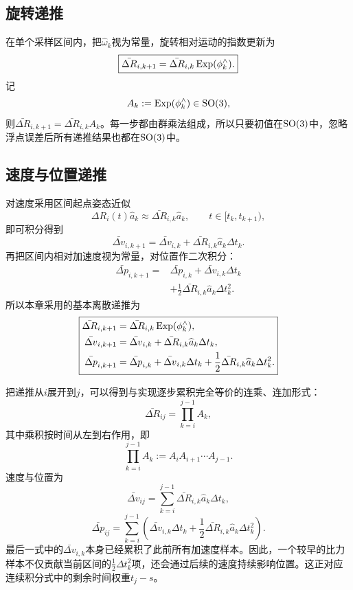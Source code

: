 \subsection{旋转递推}

在单个采样区间内，把$\widehat\omega_k$视为常量，旋转相对运动的指数更新为
\[
\boxed{
    \bar{\Delta R}_{i,k+1}
    =\bar{\Delta R}_{i,k}\operatorname{Exp}(\phi_k^\wedge).
}
\]
记
\[
    A_k:=\operatorname{Exp}(\phi_k^\wedge)\in\operatorname{SO}(3),
\]
则$\bar{\Delta R}_{i,k+1}=\bar{\Delta R}_{i,k}A_k$。每一步都由群乘法组成，所以只要初值在$\operatorname{SO}(3)$中，忽略浮点误差后所有递推结果也都在$\operatorname{SO}(3)$中。

\subsection{速度与位置递推}

对速度采用区间起点姿态近似
\[
    \Delta R_i(t)\widehat a_k
    \approx
    \bar{\Delta R}_{i,k}\widehat a_k,
    \qquad t\in[t_k,t_{k+1}),
\]
即可积分得到
\[
\boxed{
    \bar{\Delta v}_{i,k+1}
    =\bar{\Delta v}_{i,k}
    +\bar{\Delta R}_{i,k}\widehat a_k\Delta t_k.
}
\]
再把区间内相对加速度视为常量，对位置作二次积分：
\[
\boxed{
\begin{aligned}
    \bar{\Delta p}_{i,k+1}
    ={}&\bar{\Delta p}_{i,k}
    +\bar{\Delta v}_{i,k}\Delta t_k\\
    &+\frac12\bar{\Delta R}_{i,k}
      \widehat a_k\Delta t_k^2.
\end{aligned}
}
\]
所以本章采用的基本离散递推为
\[
\boxed{
\begin{aligned}
    \bar{\Delta R}_{i,k+1}
    &=\bar{\Delta R}_{i,k}\operatorname{Exp}(\phi_k^\wedge),\\
    \bar{\Delta v}_{i,k+1}
    &=\bar{\Delta v}_{i,k}
      +\bar{\Delta R}_{i,k}\widehat a_k\Delta t_k,\\
    \bar{\Delta p}_{i,k+1}
    &=\bar{\Delta p}_{i,k}
      +\bar{\Delta v}_{i,k}\Delta t_k
      +\frac12\bar{\Delta R}_{i,k}
       \widehat a_k\Delta t_k^2.
\end{aligned}
}
\]

把递推从$i$展开到$j$，可以得到与实现逐步累积完全等价的连乘、连加形式：
\[
\boxed{
    \bar{\Delta R}_{ij}
    =\prod_{k=i}^{j-1}A_k,
}
\]
其中乘积按时间从左到右作用，即
\[
    \prod_{k=i}^{j-1}A_k
    :=A_iA_{i+1}\cdots A_{j-1}.
\]
速度与位置为
\[
\boxed{
    \bar{\Delta v}_{ij}
    =\sum_{k=i}^{j-1}
      \bar{\Delta R}_{i,k}\widehat a_k\Delta t_k,
}
\]
\[
\boxed{
    \bar{\Delta p}_{ij}
    =\sum_{k=i}^{j-1}
      \left(
        \bar{\Delta v}_{i,k}\Delta t_k
        +\frac12\bar{\Delta R}_{i,k}
         \widehat a_k\Delta t_k^2
      \right).
}
\]
最后一式中的$\bar{\Delta v}_{i,k}$本身已经累积了此前所有加速度样本。因此，一个较早的比力样本不仅贡献当前区间的$\tfrac12\Delta t_k^2$项，还会通过后续的速度持续影响位置。这正对应连续积分式中的剩余时间权重$t_j-s$。

